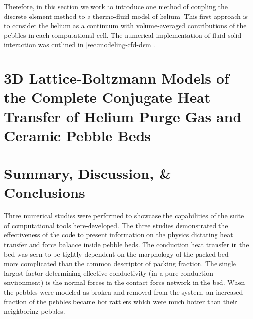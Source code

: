 Therefore, in this section we work to introduce one method of coupling the discrete element method to a thermo-fluid model of helium. This first approach is to consider the helium as a continuum with volume-averaged contributions of the pebbles in each computational cell. The numerical implementation of fluid-solid interaction was outlined in \cref{sec:modeling-cfd-dem}.












\section{3D Lattice-Boltzmann Models of the Complete Conjugate Heat Transfer of Helium Purge Gas and Ceramic Pebble Beds}\label{sec:lbm-studies}











\section{Summary, Discussion, \& Conclusions}

Three numerical studies were performed to showcase the capabilities of the suite of computational tools here-developed. The three studies demonstrated the effectiveness of the code to present information on the physics dictating heat transfer and force balance inside pebble beds. The conduction heat transfer in the bed was seen to be tightly dependent on the morphology of the packed bed - more complicated than the common descriptor of packing fraction. The single largest factor determining effective conductivity (in a pure conduction environment) is the normal forces in the contact force network in the bed. When the pebbles were modeled as broken and removed from the system, an increased fraction of the pebbles became hot rattlers which were much hotter than their neighboring pebbles. 

